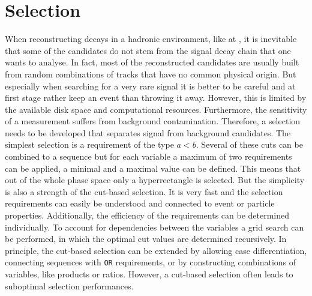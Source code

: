 
\section{Selection}
\label{sec:dataanalysis:selection}

When reconstructing decays in a hadronic environment, like at \lhcb, it is
inevitable that some of the candidates do not stem from the signal decay chain
that one wants to analyse. In fact, most of the reconstructed candidates are
usually built from random combinations of tracks that have no common physical
origin. But especially when searching for a very rare signal it is better to
be careful and at first stage rather keep an event than throwing it away.
However, this is limited by the available disk space and computational
resources. Furthermore, the sensitivity of a measurement suffers from
background contamination. Therefore, a selection needs to be developed that
separates signal from background candidates. The simplest selection is a
requirement of the type $a < b$. Several of these cuts can be combined to a
sequence but for each variable a maximum of two requirements can be applied,
\ie a minimal and a maximal value can be defined. This means that out of the
whole phase space only a hyperrectangle is selected. But the simplicity is
also a strength of the cut-based selection. It is very fast and the selection
requirements can easily be understood and connected to event or particle
properties. Additionally, the efficiency of the requirements can be determined
individually. To account for dependencies between the variables a grid search
can be performed, in which the optimal cut values are determined recursively.
In principle, the cut-based selection can be extended by allowing case
differentiation, \ie connecting sequences with \texttt{OR} requirements, or by
constructing combinations of variables, like products or ratios. However, a
cut-based selection often leads to suboptimal selection performances.